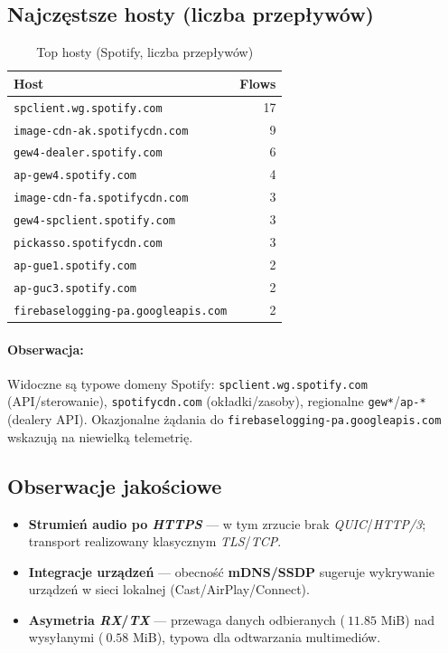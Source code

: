 \subsection{Najczęstsze hosty (liczba przepływów)}
\begin{table}[H]
  \centering
  \caption{Top hosty (Spotify, liczba przepływów)}
  \label{tab:spotify-hosts}
  \begin{tabular}{lr}
    \toprule
    \textbf{Host} & \textbf{Flows} \\
    \midrule
    \texttt{spclient.wg.spotify.com} & 17 \\
    \texttt{image-cdn-ak.spotifycdn.com} & 9 \\
    \texttt{gew4-dealer.spotify.com} & 6 \\
    \texttt{ap-gew4.spotify.com} & 4 \\
    \texttt{image-cdn-fa.spotifycdn.com} & 3 \\
    \texttt{gew4-spclient.spotify.com} & 3 \\
    \texttt{pickasso.spotifycdn.com} & 3 \\
    \texttt{ap-gue1.spotify.com} & 2 \\
    \texttt{ap-guc3.spotify.com} & 2 \\
    \texttt{firebaselogging-pa.googleapis.com} & 2 \\
    \bottomrule
  \end{tabular}
\end{table}

\paragraph{Obserwacja:}
Widoczne są typowe domeny Spotify: \texttt{spclient.wg.spotify.com} (API/sterowanie), \texttt{spotifycdn.com} (okładki/zasoby), regionalne \texttt{gew*}/\texttt{ap-*} (dealery API). Okazjonalne żądania do \texttt{firebaselogging-pa.googleapis.com} wskazują na niewielką telemetrię.

\subsection{Obserwacje jakościowe}
\begin{itemize}
  \item \textbf{Strumień audio po \emph{HTTPS}} — w tym zrzucie brak \emph{QUIC}/\emph{HTTP/3}; transport realizowany klasycznym \emph{TLS}/\emph{TCP}.
  \item \textbf{Integracje urządzeń} — obecność \textbf{mDNS/SSDP} sugeruje wykrywanie urządzeń w sieci lokalnej (Cast/AirPlay/Connect).
  \item \textbf{Asymetria \emph{RX}/\emph{TX}} — przewaga danych odbieranych (\(~11.85\) MiB) nad wysyłanymi (\(~0.58\) MiB), typowa dla odtwarzania multimediów.
\end{itemize}

